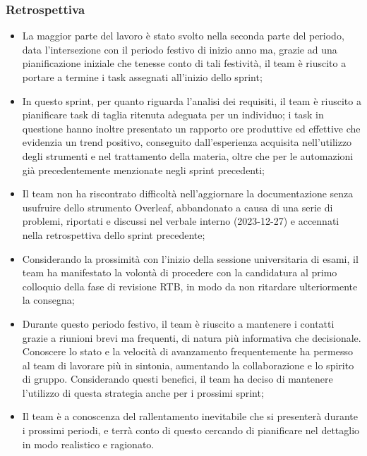 \documentclass[10pt, a4paper]{article}
\begin{document}
\subsubsection{Retrospettiva}
\begin{itemize}
    \item La maggior parte del lavoro è stato svolto nella seconda parte del periodo, data l'intersezione con il periodo festivo di inizio anno ma, grazie ad una pianificazione iniziale 
    che tenesse conto di tali festività, il team è riuscito a portare a termine i task assegnati all'inizio dello sprint;
    \item In questo sprint, per quanto riguarda l'analisi dei requisiti, il team è riuscito a pianificare task di taglia ritenuta adeguata per un individuo; i task in questione hanno inoltre 
    presentato un rapporto ore produttive ed effettive che evidenzia un trend positivo, conseguito dall'esperienza acquisita nell'utilizzo degli strumenti e nel trattamento della materia, oltre
    che per le automazioni già precedentemente menzionate negli sprint precedenti; 
    \item Il team non ha riscontrato difficoltà nell'aggiornare la documentazione senza usufruire dello strumento Overleaf, abbandonato a causa di una serie di problemi, riportati e 
    discussi nel verbale interno (2023-12-27) e accennati nella retrospettiva dello sprint precedente;
    \item Considerando la prossimità con l'inizio della sessione universitaria di esami, il team ha manifestato la volontà di procedere con la candidatura al primo colloquio della fase di revisione RTB, in modo da non ritardare ulteriormente la consegna;
    \item Durante questo periodo festivo, il team è riuscito a mantenere i contatti grazie a riunioni brevi ma frequenti, di natura più informativa che decisionale. Conoscere lo stato e la velocità di avanzamento frequentemente ha permesso al team di 
    lavorare più in sintonia, aumentando la collaborazione e lo spirito di gruppo. Considerando questi benefici, il team ha deciso di mantenere l'utilizzo di questa strategia anche per i prossimi sprint;
    \item Il team è a conoscenza del rallentamento inevitabile che si presenterà durante i prossimi periodi, e terrà conto di questo cercando di pianificare nel dettaglio in modo realistico e ragionato. 
\end{itemize}
\end{document}
